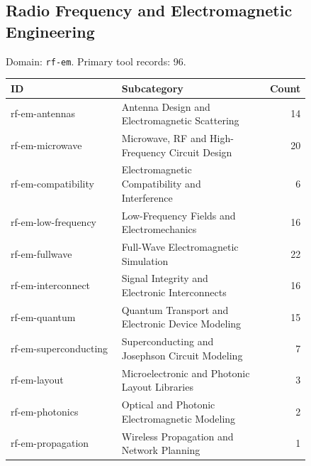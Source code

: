 \subsection{Radio Frequency and Electromagnetic Engineering}
\noindent Domain: \texttt{rf-em}. Primary tool records: 96.
\begin{longtable}{p{0.37\linewidth}p{0.47\linewidth}r}
ID & Subcategory & Count\\\hline\endhead
rf-em-antennas & Antenna Design and Electromagnetic Scattering & 14\\
rf-em-microwave & Microwave, RF and High-Frequency Circuit Design & 20\\
rf-em-compatibility & Electromagnetic Compatibility and Interference & 6\\
rf-em-low-frequency & Low-Frequency Fields and Electromechanics & 16\\
rf-em-fullwave & Full-Wave Electromagnetic Simulation & 22\\
rf-em-interconnect & Signal Integrity and Electronic Interconnects & 16\\
rf-em-quantum & Quantum Transport and Electronic Device Modeling & 15\\
rf-em-superconducting & Superconducting and Josephson Circuit Modeling & 7\\
rf-em-layout & Microelectronic and Photonic Layout Libraries & 3\\
rf-em-photonics & Optical and Photonic Electromagnetic Modeling & 2\\
rf-em-propagation & Wireless Propagation and Network Planning & 1\\
\end{longtable}
